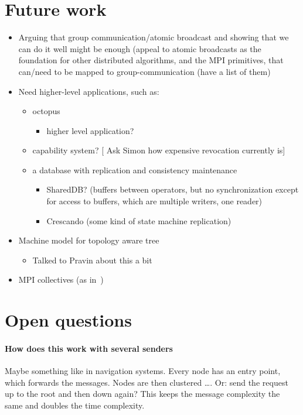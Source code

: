 \documentclass{article}
\newcommand{\stefan}[1]{
  {\color{skRed}[{\color{red}{SK}} #1]}}
\begin{document}
\section{Future work}

\begin{itemize}
\item Arguing that group communication/atomic broadcast and showing
  that we can do it well might be enough (appeal to atomic broadcasts
  as the foundation for other distributed algorithms, and the MPI
  primitives, that can/need to be mapped to group-communication (have
  a list of them) 
\item Need higher-level applications, such as:
  \begin{itemize}
  \item octopus
    \begin{itemize}
    \item higher level application?
    \end{itemize}
  \item capability system? \stefan{Ask Simon how expensive revocation
      currently is}
  \item a database with replication and consistency maintenance
    \begin{itemize}
    \item SharedDB? (buffers between operators, but no synchronization
      except for access to buffers, which are multiple writers, one
      reader)
    \item Crescando (some kind of state machine replication)
    \end{itemize}
  \end{itemize}
\item Machine model for topology aware tree
  \begin{itemize}
  \item Talked to Pravin about this a bit
  \end{itemize}
\item MPI collectives (as in~\cite{Tu2008})
\end{itemize}

\section{Open questions}

\paragraph{How does this work with several senders} 
Maybe something like in navigation systems. Every node has an entry
point, which forwards the messages. Nodes are then clustered
\ldots. Or: send the request up to the root and then down again? This
keeps the message complexity the same and doubles the time
complexity. 

\newpage



\label{LastPage}
\end{document}
